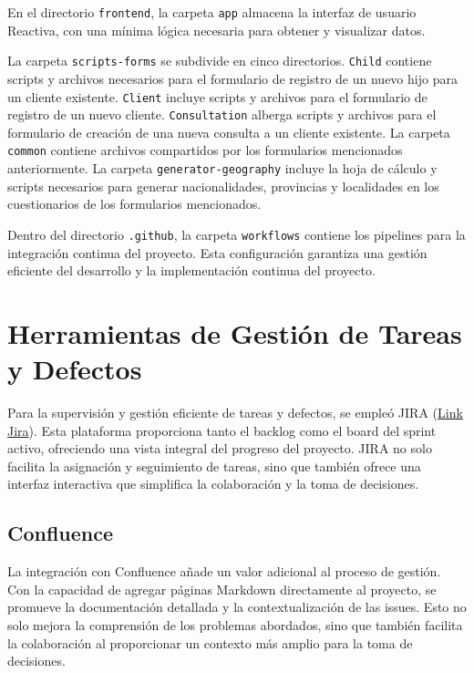 En el directorio \texttt{frontend}, la carpeta \texttt{app} almacena la interfaz de usuario Reactiva, con una mínima lógica necesaria para obtener y visualizar datos.

La carpeta \texttt{scripts-forms} se subdivide en cinco directorios. \texttt{Child} contiene scripts y archivos necesarios para el formulario de registro de un nuevo hijo para un cliente existente. \texttt{Client} incluye scripts y archivos para el formulario de registro de un nuevo cliente. \texttt{Consultation} alberga scripts y archivos para el formulario de creación de una nueva consulta a un cliente existente. La carpeta \texttt{common} contiene archivos compartidos por los formularios mencionados anteriormente. La carpeta \texttt{generator-geography} incluye la hoja de cálculo y scripts necesarios para generar nacionalidades, provincias y localidades en los cuestionarios de los formularios mencionados.

Dentro del directorio \texttt{.github}, la carpeta \texttt{workflows} contiene los pipelines para la integración continua del proyecto. Esta configuración garantiza una gestión eficiente del desarrollo y la implementación continua del proyecto.


\section{Herramientas de Gestión de Tareas y Defectos}

Para la supervisión y gestión eficiente de tareas y defectos, se empleó JIRA (\href{https://prietojulii.atlassian.net/jira/software/projects/PAT/boards/1}{Link Jira}). Esta plataforma proporciona tanto el backlog como el board del sprint activo, ofreciendo una vista integral del progreso del proyecto. JIRA no solo facilita la asignación y seguimiento de tareas, sino que también ofrece una interfaz interactiva que simplifica la colaboración y la toma de decisiones. 

\subsection{Confluence}
La integración con Confluence añade un valor adicional al proceso de gestión. Con la capacidad de agregar páginas Markdown directamente al proyecto, se promueve la documentación detallada y la contextualización de las issues. Esto no solo mejora la comprensión de los problemas abordados, sino que también facilita la colaboración al proporcionar un contexto más amplio para la toma de decisiones.

